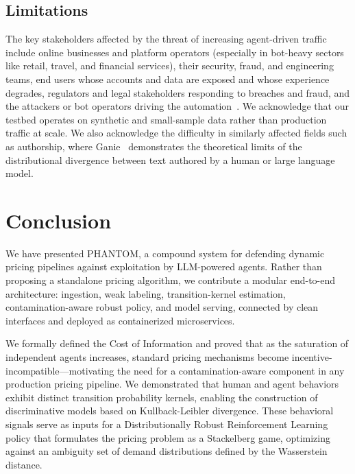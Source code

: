 \documentclass[sigconf]{acmart}
\begin{document}
\subsection{Limitations}

The key stakeholders affected by the threat of increasing agent-driven traffic include online businesses and platform operators (especially in bot-heavy sectors like retail, travel, and financial services), their security, fraud, and engineering teams, end users whose accounts and data are exposed and whose experience degrades, regulators and legal stakeholders responding to breaches and fraud, and the attackers or bot operators driving the automation~\cite{imperva_rapid_2025}. We acknowledge that our testbed operates on synthetic and small-sample data rather than production traffic at scale. We also acknowledge the difficulty in similarly affected fields such as authorship, where Ganie~\cite{ganie_uncertainty_2025} demonstrates the theoretical limits of the distributional divergence between text authored by a human or large language model.


\section{Conclusion}

We have presented PHANTOM, a compound system for defending dynamic pricing pipelines against exploitation by LLM-powered agents. Rather than proposing a standalone pricing algorithm, we contribute a modular end-to-end architecture: ingestion, weak labeling, transition-kernel estimation, contamination-aware robust policy, and model serving, connected by clean interfaces and deployed as containerized microservices.

We formally defined the Cost of Information and proved that as the saturation of independent agents increases, standard pricing mechanisms become incentive-incompatible---motivating the need for a contamination-aware component in any production pricing pipeline. We demonstrated that human and agent behaviors exhibit distinct transition probability kernels, enabling the construction of discriminative models based on Kullback-Leibler divergence. These behavioral signals serve as inputs for a Distributionally Robust Reinforcement Learning policy that formulates the pricing problem as a Stackelberg game, optimizing against an ambiguity set of demand distributions defined by the Wasserstein distance.
\end{document}
